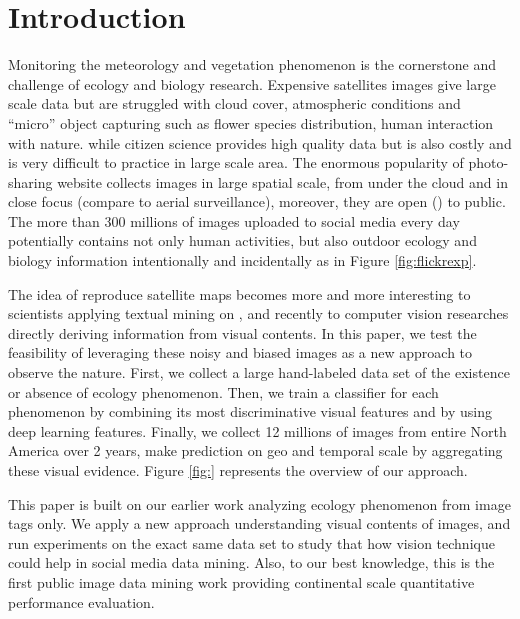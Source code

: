 \documentclass[10pt]{article}
\begin{document}
\section{Introduction}

Monitoring the meteorology and vegetation phenomenon is the cornerstone and challenge of ecology and biology research. Expensive satellites images give large scale data but are struggled with cloud cover, 
atmospheric conditions and ``micro'' object capturing such as flower species distribution, human interaction with nature.
while citizen science provides high quality data but is also costly and is very difficult to practice in large scale area. 
The enormous popularity of photo-sharing website collects images in large spatial scale, from under the cloud and in close focus (compare to aerial surveillance), 
moreover, they are open () to public.
The more than 300 millions of images uploaded to social media every day
\cite{https://zephoria.com/top-15-valuable-facebook-statistics/}
 potentially contains not only human activities, but also outdoor ecology and biology information intentionally and incidentally as in Figure \ref{fig:flickrexp}.

The idea of reproduce satellite maps becomes more and more interesting to scientists applying textual mining on , 
and recently to computer vision researches directly deriving  information from visual contents.
In this paper, we test the feasibility of leveraging these noisy and biased images as a new approach to observe the nature. 
First, we collect a large hand-labeled data set of the existence or absence of ecology phenomenon. 
Then, we train a classifier for each phenomenon by combining its most discriminative visual features and by using deep learning features. 
Finally, we collect 12 millions of images from entire North America over 2 years, make prediction on geo and temporal scale by aggregating these visual evidence. Figure \ref{fig:} represents the overview of our approach.

This paper is built on our earlier work  analyzing ecology phenomenon from image tags only. We apply a new approach understanding visual contents of images, and run experiments on the exact same data set to study that how vision technique could help in social media data mining. Also, to our best knowledge, this is the first public image data mining work providing continental scale quantitative performance evaluation.
\end{document}
